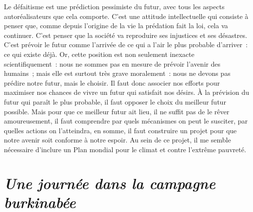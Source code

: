 \documentclass[a5paper,french,openany]{memoir}
\begin{document}
Le défaitisme %
est une prédiction pessimiste du futur, avec tous les aspects autoréalisateurs que cela comporte. C'est une attitude intellectuelle qui consiste à penser que, comme depuis l'origine de la vie la prédation fait la loi, cela va continuer. C'est penser %
que la société va reproduire ses injustices et ses désastres. C'est prévoir le futur comme l'arrivée de ce qui a l'air le plus probable d'arriver~: ce qui existe déjà. Or, cette position est non seulement inexacte scientifiquement~: nous ne sommes pas en mesure de prévoir l'avenir des humains~; mais elle est surtout très grave moralement~: nous ne devons pas prédire notre futur, mais le choisir. %
Il faut donc associer nos efforts pour maximiser nos chances de vivre un futur qui satisfait nos désirs. À la prévision du futur qui paraît le plus probable, il faut opposer le choix du meilleur futur possible. Mais pour que ce meilleur futur ait lieu, il ne suffit pas de le rêver amoureusement, il faut comprendre par quels mécanismes on peut le susciter, par quelles actions on l'atteindra, en somme, il faut construire un projet pour que notre avenir soit conforme à notre espoir.
%
Au sein de ce projet, il me semble nécessaire d'inclure un Plan mondial pour le climat et contre l'extrême pauvreté. %

\chapter*{\textit{Une journée dans la campagne burkinabée}}\label{ch:narr_burkina}
\end{document}
